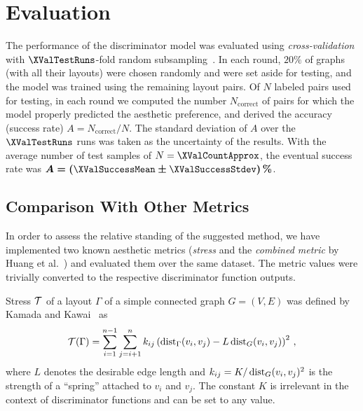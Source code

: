 
%

\section{Evaluation}
\label{sec:eval}

The performance of the discriminator model was evaluated using \emph{cross-validation} with $\XValTestRuns$-fold random
subsampling~\cite{Kohavi1995}.  In each round, $20\percent$ of graphs (with all their layouts) were chosen randomly and
were set aside for testing, and the model was trained using the remaining layout pairs.  Of $N$ labeled pairs used for
testing, in each round we computed the number $N_\mathrm{correct}$ of pairs for which the model properly predicted the
aesthetic preference, and derived the accuracy (success rate) $A=N_\mathrm{correct}/N$.  The standard deviation of $A$
over the $\XValTestRuns$ runs was taken as the uncertainty of the results.  With the average number of test samples of
$N=\XValCountApprox$, the eventual success rate was $\boldsymbol{A=(\XValSuccessMean\pm\XValSuccessStdev)\percent}$.

\subsection{Comparison With Other Metrics}

In order to assess the relative standing of the suggested method, we have implemented two known aesthetic metrics
(\emph{stress} and the \emph{combined metric} by Huang et al.~\cite{HuangHL16}) and evaluated them over the same
dataset.  The metric values were trivially converted to the respective discriminator function outputs.

Stress $\operatorname{\mathcal{T}}$ of a layout $\Gamma$ of a simple connected graph $G=(V,E)$ was defined by Kamada and
Kawai~\cite{Kamada1989} as
\begin{equation}
  \operatorname{\mathcal{T}}(\Gamma) = \sum_{i=1}^{n-1} \sum_{j=i+1}^{n}
  k_{ij} \left( \operatorname{dist}_\Gamma(v_i,v_j) - L \operatorname{dist}_G(v_i,v_j) \right)^2
  \,,
  \label{eq:stress}
\end{equation}
where $L$ denotes the desirable edge length and $k_{ij}=K/\operatorname{dist}_G(v_i,v_j)^2$ is the strength of a \enquote{spring}
attached to $v_i$ and $v_j$.  The constant $K$ is irrelevant in the context of discriminator functions and can be set to
any value.

